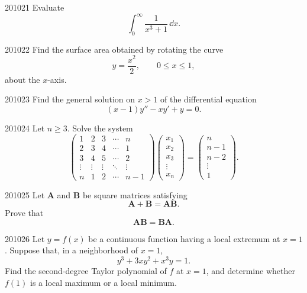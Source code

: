 
\begin{problem}{2010}{2}{1}
Evaluate
\[
    \int_0^{\infty}\frac{1}{x^3+1}\, \dd x.
\]
\end{problem}

\begin{problem}{2010}{2}{2}
Find the surface area obtained by rotating the curve
\[
    y=\frac{x^2}{2},
    \qquad 0\le x\le1,
\]
about the $x$-axis.
\end{problem}

\begin{problem}{2010}{2}{3}
Find the general solution on $x>1$ of the differential equation
\[
    (x-1)y''-xy'+y=0.
\]
\end{problem}

\begin{problem}{2010}{2}{4}
Let $n\ge3$. Solve the system
\[
\begin{pmatrix}
1&2&3&\cdots&n\\
2&3&4&\cdots&1\\
3&4&5&\cdots&2\\
\vdots&\vdots&\vdots&\ddots&\vdots\\
n&1&2&\cdots&n-1
\end{pmatrix}
\begin{pmatrix}
x_1\\x_2\\x_3\\\vdots\\x_n
\end{pmatrix}
=
\begin{pmatrix}
n\\n-1\\n-2\\\vdots\\1
\end{pmatrix}.
\]
\end{problem}

\begin{problem}{2010}{2}{5}
Let $\mathbf A$ and $\mathbf B$ be square matrices satisfying
\[
    \mathbf A+\mathbf B=\mathbf A\mathbf B.
\]
Prove that
\[
    \mathbf A\mathbf B=\mathbf B\mathbf A.
\]
\end{problem}

\begin{problem}{2010}{2}{6}
Let $y=f(x)$ be a continuous function having a local extremum at $x=1$. Suppose that, in a neighborhood of $x=1$,
\[
    y^3+3xy^2+x^3y=1.
\]
Find the second-degree Taylor polynomial of $f$ at $x=1$, and determine whether $f(1)$ is a local maximum or a local minimum.
\end{problem}

